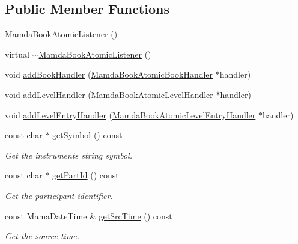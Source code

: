 \subsection*{Public Member Functions}
\begin{CompactItemize}
\item 
\hyperlink{classWombat_1_1MamdaBookAtomicListener_63f5ebdd93ecd7cad9c07af399508aec}{Mamda\-Book\-Atomic\-Listener} ()
\item 
virtual \hyperlink{classWombat_1_1MamdaBookAtomicListener_e5fac16c2989c755913451373c5d4fbf}{$\sim$Mamda\-Book\-Atomic\-Listener} ()
\item 
void \hyperlink{classWombat_1_1MamdaBookAtomicListener_d1d58170780173a80d63128d3a12425c}{add\-Book\-Handler} (\hyperlink{classWombat_1_1MamdaBookAtomicBookHandler}{Mamda\-Book\-Atomic\-Book\-Handler} $\ast$handler)
\item 
void \hyperlink{classWombat_1_1MamdaBookAtomicListener_8ee92b1c11caaf8fb358904dad96b7b7}{add\-Level\-Handler} (\hyperlink{classWombat_1_1MamdaBookAtomicLevelHandler}{Mamda\-Book\-Atomic\-Level\-Handler} $\ast$handler)
\item 
void \hyperlink{classWombat_1_1MamdaBookAtomicListener_749db39c3d4f92bc109377a20ed0a631}{add\-Level\-Entry\-Handler} (\hyperlink{classWombat_1_1MamdaBookAtomicLevelEntryHandler}{Mamda\-Book\-Atomic\-Level\-Entry\-Handler} $\ast$handler)
\item 
const char $\ast$ \hyperlink{classWombat_1_1MamdaBookAtomicListener_70cfa31bc3d1010dc24c768525dbd62c}{get\-Symbol} () const 
\begin{CompactList}\small\item\em Get the instruments string symbol. \item\end{CompactList}\item 
const char $\ast$ \hyperlink{classWombat_1_1MamdaBookAtomicListener_b976bfe1cf039410ca1c586214d6f2f2}{get\-Part\-Id} () const 
\begin{CompactList}\small\item\em Get the participant identifier. \item\end{CompactList}\item 
const Mama\-Date\-Time \& \hyperlink{classWombat_1_1MamdaBookAtomicListener_a43104e4c912b926990c05ff0f35ef02}{get\-Src\-Time} () const 
\begin{CompactList}\small\item\em Get the source time. \item\end{CompactList}\item 

\end{CompactItemize}

